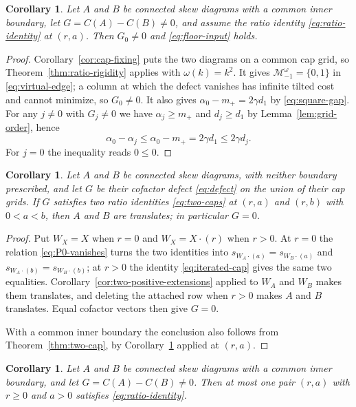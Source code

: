 \documentclass[11pt,a4paper]{amsart}
\numberwithin{equation}{section}
\theoremstyle{plain}
\newtheorem{corollary}[theorem]{Corollary}
\theoremstyle{definition}
\begin{document}
\begin{corollary}\label{cor:floor-supplies}
Let \(A\) and \(B\) be connected skew diagrams with a common inner boundary, let \(G=C(A)-C(B)\ne0\), and assume the ratio identity \eqref{eq:ratio-identity} at \((r,a)\).  Then \(G_0\ne0\) and \eqref{eq:floor-input} holds.
\end{corollary}

\begin{proof}
Corollary~\ref{cor:cap-fixing} puts the two diagrams on a common cap grid, so Theorem~\ref{thm:ratio-rigidity} applies with \(\omega(k)=k^2\).  It gives \(\mathcal M_{-1}^\omega=\{0,1\}\) in \eqref{eq:virtual-edge}; a column at which the defect vanishes has infinite tilted cost and cannot minimize, so \(G_0\ne0\).  It also gives \(\alpha_0-m_+=2\gamma d_1\) by \eqref{eq:square-gap}.  For any \(j\ne0\) with \(G_j\ne0\) we have \(\alpha_j\ge m_+\) and \(d_j\ge d_1\) by Lemma~\ref{lem:grid-order}, hence
\[
\alpha_0-\alpha_j
\le
\alpha_0-m_+
=
2\gamma d_1
\le
2\gamma d_j.
\]
For \(j=0\) the inequality reads \(0\le0\).
\end{proof}

\begin{corollary}\label{cor:double-cap-kills}
Let \(A\) and \(B\) be connected skew diagrams, with neither boundary prescribed, and let \(G\) be their cofactor defect \eqref{eq:defect} on the union of their cap grids.  If \(G\) satisfies two ratio identities \eqref{eq:two-caps} at \((r,a)\) and \((r,b)\) with \(0<a<b\), then \(A\) and \(B\) are translates; in particular \(G=0\).
\end{corollary}

\begin{proof}
Put \(W_X=X\) when \(r=0\) and \(W_X=X\cdot(r)\) when \(r>0\).  At \(r=0\) the relation \eqref{eq:P0-vanishes} turns the two identities into \(s_{W_A\cdot(a)}=s_{W_B\cdot(a)}\) and \(s_{W_A\cdot(b)}=s_{W_B\cdot(b)}\); at \(r>0\) the identity \eqref{eq:iterated-cap} gives the same two equalities.  Corollary~\ref{cor:two-positive-extensions} applied to \(W_A\) and \(W_B\) makes them translates, and deleting the attached row when \(r>0\) makes \(A\) and \(B\) translates.  Equal cofactor vectors then give \(G=0\).

With a common inner boundary the conclusion also follows from Theorem~\ref{thm:two-cap}, by Corollary~\ref{cor:floor-supplies} applied at \((r,a)\).
\end{proof}

\begin{corollary}\label{cor:unique-ratio}
Let \(A\) and \(B\) be connected skew diagrams with a common inner boundary, and let \(G=C(A)-C(B)\ne0\).  Then at most one pair \((r,a)\) with \(r\ge0\) and \(a>0\) satisfies \eqref{eq:ratio-identity}.
\end{corollary}
\end{document}
